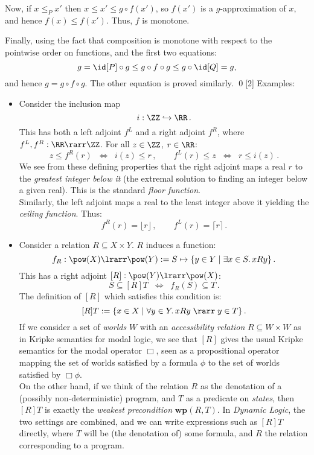\documentclass[12pt]{article}
\begin{document}
Now, if $x \leq_{P} x'$ then $x \leq x' \leq g \circ f(x')$, so $f(x')$ is a $g$-approximation of $x$, and hence $f(x) \leq f(x')$. Thus,
$f$ is monotone.

Finally, using the fact that composition is monotone with
respect to the pointwise order on functions, and the first two equations:
\[ g = \id[P] \circ g \leq g \circ f \circ g \leq g \circ \id[Q] = g, \]
and hence $g = g \circ f \circ g$. The other equation is proved similarly. \qed[2]
%
Examples:
\begin{itemize}
\item Consider the inclusion map
\[ i : \ZZ \hookrightarrow \RR\,. \]
This has both a left adjoint $f^{L}$ and a right adjoint $f^{R}$, where $f^{L}, f^{R} : \RR \rarr \ZZ$. For all $z \in \ZZ$, $r \in \RR$:
\[ z \leq f^{R}(r)  \;\; \Longleftrightarrow \;\;  i(z) \leq r \,,\qquad f^{L}(r) \leq z  \;\; \Longleftrightarrow \;\;  r \leq i(z)\,. \]
We see from these defining properties that the right adjoint maps a real $r$ to the \emph{greatest integer below it} (the extremal solution to finding
an integer below a given real). This is the standard \emph{floor function}.\\ Similarly, the left adjoint maps a real to the least integer above it
yielding the \emph{ceiling function}. Thus:
\[ f^{R}(r) = \lfloor r \rfloor\,, \qquad f^{L}(r) = \lceil r \rceil\,. \]
%
\item Consider a relation $R \subseteq  X \times Y$. $R$ induces a function:
\[ f_{R} : \pow(X) \lrarr \pow(Y):= S \mapsto \{ y \in Y \mid \exists x \in S.\, xRy \}\,. \]
This has a right adjoint $[R] : \pow(Y) \lrarr \pow(X)$:
\[ S \subseteq [R]T \;\; \Longleftrightarrow \;\; f_{R}(S) \subseteq T\,. \]
The definition of $[R]$ which satisfies this condition is:
\[ [R]T := \{ x \in X \mid \forall y \in Y. \, xRy \; \rarr \; y \in T \}\,. \]
If we consider a set of \emph{worlds} $W$ with an \emph{accessibility relation} $R \subseteq W \times W$ as in Kripke semantics for modal logic, we see
that $[R]$ gives the usual Kripke semantics for the modal operator $\Box$, seen as a propositional operator mapping the set of worlds satisfied by a
formula $\phi$ to the set of worlds satisfied by $\Box \phi$.
\\
On the other hand, if we think of the relation $R$ as the denotation of a (possibly non-deterministic) program, and $T$ as a predicate on
\emph{states}, then $[R]T$ is exactly the \emph{weakest precondition} $\mathbf{wp}(R, T)$. In \emph{Dynamic Logic}, the two settings are combined, and
we can write expressions such as $[R]T$ directly, where $T$ will be (the denotation of) some formula, and $R$ the relation corresponding to a program.

\end{itemize}
\end{document}
